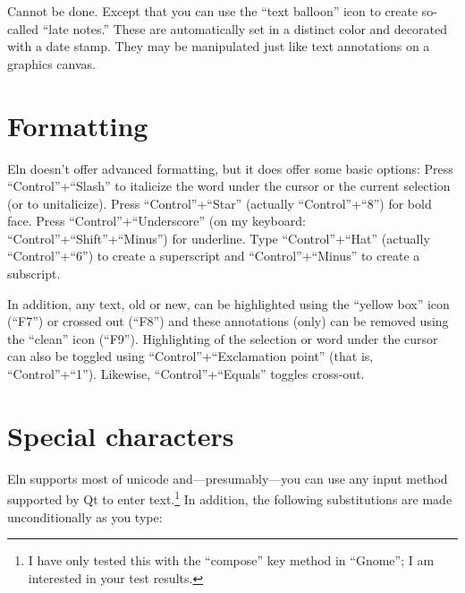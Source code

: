 \documentclass[11pt]{report}
\begin{document}
Cannot be done. Except that you can use the ``text balloon'' icon to
create so-called ``late notes.'' These are automatically set in a
distinct color and decorated with a date stamp. They
may be manipulated just like text annotations on a graphics canvas.

\section{Formatting}

Eln doesn't offer advanced formatting, but it does offer some basic
options: Press ``Control''+``Slash'' to italicize the word under the
cursor or the current selection (or to unitalicize). Press
``Control''+``Star'' (actually ``Control''+``8'') for bold face. Press
``Control''+``Underscore'' (on my keyboard:
``Control''+``Shift''+``Minus'') for underline. Type
``Control''+``Hat'' (actually ``Control''+``6'') to create a
superscript and ``Control''+``Minus'' to create a subscript.

In addition, any text, old or new, can be highlighted using the
``yellow box'' icon (``F7'') or crossed out (``F8'') and these
annotations (only) can be removed using the ``clean'' icon
(``F9''). Highlighting of the selection or word under the cursor can
also be toggled using ``Control''+``Exclamation point'' (that is,
``Control''+``1''). Likewise, ``Control''+``Equals'' toggles
cross-out.

\section{Special characters}

Eln supports most of unicode and---presumably---you can use any input method
supported by Qt to enter text.\footnote{I have only
  tested this with the ``compose'' key method in ``Gnome''; I am
  interested in your test results.} In addition, the following
substitutions are made unconditionally as you type:\medskip
\end{document}
